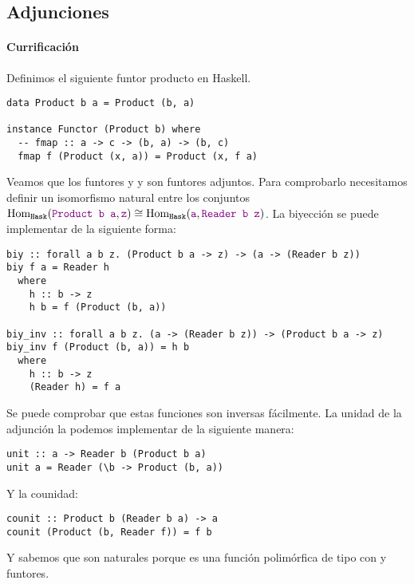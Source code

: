 \subsection{Adjunciones}
\paragraph{Currificación}
Definimos el siguiente funtor producto en Haskell.
\begin{verbatim}
data Product b a = Product (b, a)

instance Functor (Product b) where
  -- fmap :: a -> c -> (b, a) -> (b, c)
  fmap f (Product (x, a)) = Product (x, f a)
\end{verbatim}
Veamos que los funtores  y y 
son funtores adjuntos. Para comprobarlo necesitamos definir
un isomorfismo natural entre los conjuntos
$\operatorname{Hom}_{\texttt{Hask}}(\textcolor{violet}{\texttt{Product b a}}, \textcolor{violet}{\texttt{z}}) \cong
\operatorname{Hom}_{\texttt{Hask}}(\textcolor{violet}{\texttt{a}}, \textcolor{violet}{\texttt{Reader b z}})$. La biyección se puede
implementar de la siguiente forma:
\begin{verbatim}
biy :: forall a b z. (Product b a -> z) -> (a -> (Reader b z))
biy f a = Reader h
  where
    h :: b -> z
    h b = f (Product (b, a))

biy_inv :: forall a b z. (a -> (Reader b z)) -> (Product b a -> z)
biy_inv f (Product (b, a)) = h b
  where
    h :: b -> z
    (Reader h) = f a
\end{verbatim}

Se puede comprobar que estas funciones
son inversas fácilmente. La unidad de
la adjunción la podemos
implementar de la siguiente manera:
\begin{verbatim}
unit :: a -> Reader b (Product b a)
unit a = Reader (\b -> Product (b, a))
\end{verbatim}
Y la counidad:
\begin{verbatim}
counit :: Product b (Reader b a) -> a
counit (Product (b, Reader f)) = f b
\end{verbatim}

Y sabemos que son naturales porque es una función
polimórfica de tipo  con  y 
funtores.

